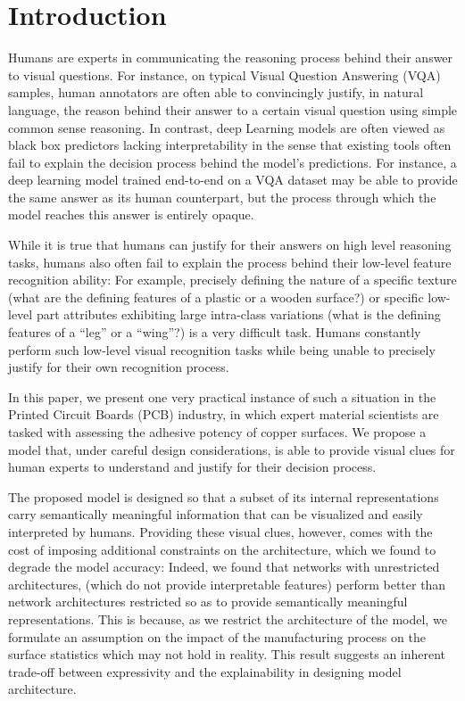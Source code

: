 \documentclass[10pt,twocolumn,letterpaper]{article}
\begin{document}
\section{Introduction}

Humans are experts in communicating the reasoning process behind their answer to visual questions.
For instance, on typical Visual Question Answering (VQA) samples\cite{antol2015vqa}\cite{zhang2016yin}\cite{goyal2017making}, 
human annotators are often able to convincingly justify, in natural language, the reason 
behind their answer to a certain visual question using simple common sense reasoning.
In contrast, deep Learning models are often viewed as black box predictors lacking interpretability 
in the sense that existing tools often fail to explain the decision process behind the model’s predictions.
For instance, a deep learning model trained end-to-end on a VQA dataset may be able to provide the same answer as its
human counterpart, but the process through which the model reaches this answer is entirely opaque.

While it is true that humans can justify for their answers on high level reasoning tasks, 
humans also often fail to explain the process behind their low-level feature recognition ability:
For example, precisely defining the nature of a specific texture 
(what are the defining features of a plastic or a wooden surface?) 
or specific low-level part attributes exhibiting large intra-class variations 
(what is the defining features of a ``leg'' or a ``wing''?) is a very difficult task.
Humans constantly perform such low-level visual recognition tasks 
while being unable to precisely justify for their own recognition process.
	
In this paper, we present one very practical instance of such a situation in the Printed Circuit Boards (PCB) industry, 
in which expert material scientists are tasked with assessing the adhesive potency of copper surfaces.
We propose a model that, under careful design considerations, is able to provide visual clues 
for human experts to understand and justify for their decision process.
	
The proposed model is designed so that a subset of its internal representations carry semantically meaningful 
information that can be visualized and easily interpreted by humans.
Providing these visual clues, however, comes with the cost of imposing additional constraints on the architecture,
which we found to degrade the model accuracy:
Indeed, we found that networks with unrestricted architectures, 
(which do not provide interpretable features)
perform better than network architectures restricted so as to provide 
semantically meaningful representations.
This is because, as we restrict the architecture of the model, 
we formulate an assumption on the impact of the manufacturing process 
on the surface statistics which may not hold in reality.
This result suggests an inherent trade-off between  
expressivity and the explainability in designing model architecture.
	
\end{document}
